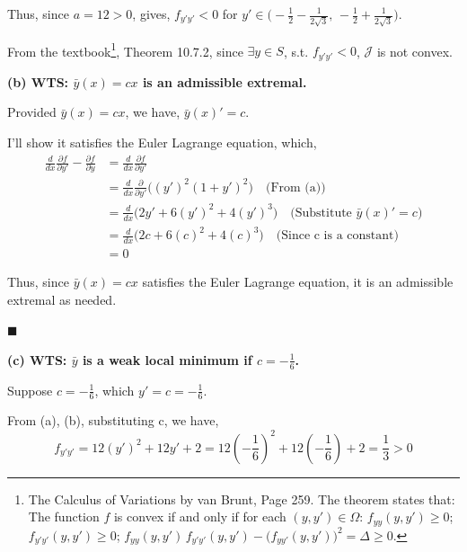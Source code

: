 \documentclass[12pt]{article}
\begin{document}
Thus, since $a= 12 > 0$, gives, $f_{y'y'}< 0$ for $y' \in\bigl(-\frac{1}{2}-\frac{1}{2\sqrt3},\,-\tfrac12+\tfrac1{2\sqrt3}\bigr)$.


From the textbook\footnote{The Calculus of Variations by van Brunt, Page 259. The theorem states that: The function $f$ is convex if and only if for each $(y, y') \in \Omega$: $f_{yy}(y,y') \geq 0$; $f_{y'y'}(y,y') \geq 0$; $f_{yy}(y,y')\,f_{y'y'}(y,y') - \big(f_{yy'}(y,y')\big)^2 = \Delta \geq 0$.}, Theorem 10.7.2, since $\exists y \in S$, s.t. $f_{y'y'} < 0$, $\mathcal J$ is not convex.

\vspace{10pt}
\noindent
\textbf{(b) WTS: $\bar y(x)=cx$ is an admissible extremal.}

Provided $\bar y(x)=cx$, we have, $\bar y(x)' = c$.

I'll show it satisfies the Euler Lagrange equation, which, 
\begin{align*}
	\frac{d}{dx}\frac{\partial f}{\partial y'} - \frac{\partial f}{\partial y} &= \frac{d}{dx}\frac{\partial f}{\partial y'} \\
	&= \frac{d}{dx}\frac{\partial }{\partial y'}\bigl( (y')^2(1+y')^2\bigr) \quad \text{(From (a))} \\
	&= \frac{d}{dx} \bigl( 2y' + 6(y')^2 + 4(y')^3 \bigr) \quad \text{(Substitute $\bar y(x)' = c$)} \\
	&= \frac{d}{dx} \bigl( 2c + 6(c)^2 + 4(c)^3 \bigr) \quad \text{(Since c is a constant)} \\
	&= 0
\end{align*}

Thus, since $\bar y(x)=cx$ satisfies the Euler Lagrange equation, it is an admissible extremal as needed.

\hfill $\blacksquare$

\newpage

\noindent
\textbf{(c) WTS: $\bar y$ is a weak local minimum if $c=-\frac{1}{6}$.} 

Suppose $c=-\frac{1}{6}$, which $y' = c = -\frac{1}{6}$.

From (a), (b), substituting c, we have, 
$$f_{y'y'} = 12 (y')^2 + 12y' + 2  = 12\left(-\frac{1}{6}\right)^2 + 12\left(-\frac{1}{6}\right) + 2 = \frac{1}{3} > 0 $$
\end{document}
